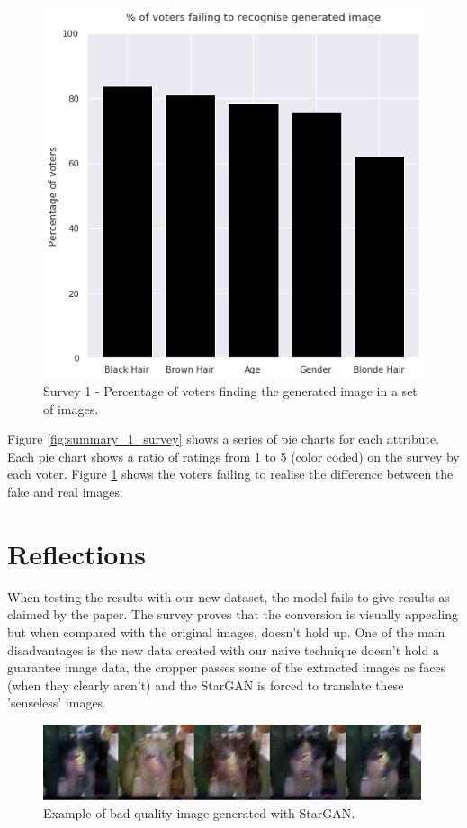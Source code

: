 \documentclass[preprint,12pt]{elsarticle}
\begin{document}
\begin{figure}[!htb]
\centering\includegraphics[width=0.7\linewidth]{accuracy_evaluation.png}
\caption{Survey 1 - Percentage of voters finding the generated image in a set of images.}
\label{fig:accuracy_survey}
\end{figure}


Figure \ref{fig:summary_1_survey} shows a series of pie charts for each attribute. Each pie chart shows a ratio of ratings from 1 to 5 (color coded) on the survey by each voter. Figure \ref{fig:accuracy_survey} shows the voters failing to realise the difference between the fake and real images.



\section{Reflections}
\label{S:6}


When testing the results with our new dataset, the model fails to give results as claimed by the paper. The survey proves that the conversion is visually appealing but when compared with the original images, doesn't hold up. One of the main disadvantages is the new data created with our naive technique doesn't hold a guarantee image data, the cropper passes some of the extracted images as faces (when they clearly aren't) and the StarGAN is forced to translate these 'senseless' images. 

\begin{figure}[ht]
\centering\includegraphics[width=0.7\linewidth]{non_face_image.jpg}
\caption{Example of bad quality image generated with StarGAN.}
\label{fig:StarGAN_bad}
\end{figure}
\end{document}
